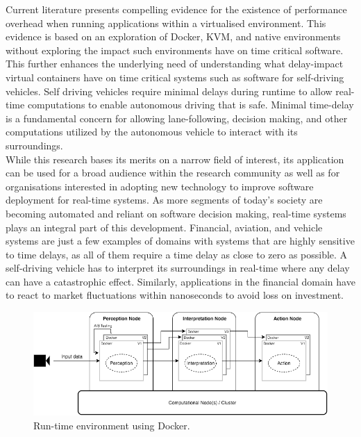 Current literature \cite{vmvscontainers} presents compelling evidence for the existence of performance overhead when running applications within a virtualised environment. This evidence is based on an exploration of Docker, KVM, and native environments without exploring the impact such environments have on time critical software. This further enhances the underlying need of understanding what delay-impact virtual containers have on time critical systems such as software for self-driving vehicles. Self driving vehicles require minimal delays during runtime to allow real-time computations to enable autonomous driving that is safe. Minimal time-delay is a fundamental concern for allowing lane-following, decision making, and other computations utilized by the autonomous vehicle to interact with its surroundings.\\

While this research bases its merits on a narrow field of interest, its application can be used for a broad audience within the research community as well as for organisations interested in adopting new technology to improve software deployment for real-time systems. As more segments of today's society are becoming automated and reliant on software decision making, real-time systems plays an integral part of this development. Financial, aviation, and vehicle systems are just a few examples of domains with systems that are highly sensitive to time delays, as all of them require a time delay as close to zero as possible. A self-driving vehicle has to interpret its surroundings in real-time where any delay can have a catastrophic effect. Similarly, applications in the financial domain have to react to market fluctuations within nanoseconds to avoid loss on investment. \\

\begin{figure}[ht]
\centering
     \includegraphics[width=1.0\textwidth]{./figure/containers.png}
      \caption{Run-time environment using Docker.}
       \label{containers}
\end{figure}


